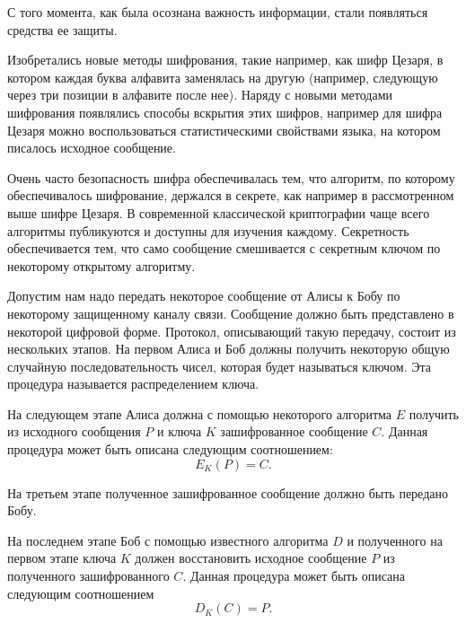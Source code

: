 С того момента, как была осознана важность информации, стали появляться
средства ее защиты. 

Изобретались новые методы
шифрования, такие например, как шифр Цезаря, в котором каждая буква
алфавита заменялась на другую (например, следующую через три позиции в
алфавите после нее). Наряду с новыми методами шифрования появлялись
способы вскрытия этих шифров, например для шифра Цезаря можно
воспользоваться статистическими свойствами языка, на котором
писалось исходное сообщение.

Очень часто безопасность шифра обеспечивалась тем, что алгоритм, по
которому обеспечивалось шифрование, держался в секрете, как например в
рассмотренном выше шифре Цезаря. В современной классической
криптографии чаще всего алгоритмы
публикуются и доступны для изучения каждому. Секретность
обеспечивается тем, что само сообщение смешивается с секретным ключом
по некоторому открытому алгоритму. 

Допустим нам надо передать некоторое сообщение от Алисы к Бобу по
некоторому защищенному каналу связи. Сообщение должно быть
представлено в некоторой цифровой форме.
Протокол, описывающий такую
передачу, состоит из нескольких этапов. На первом Алиса и Боб должны
получить некоторую общую случайную последовательность чисел, которая
будет называться ключом. Эта процедура называется распределением
ключа. 

На следующем этапе Алиса должна с помощью
некоторого алгоритма $E$ получить из исходного сообщения $P$ и ключа $K$
зашифрованное сообщение $C$. Данная процедура может быть описана следующим
соотношением: 
\begin{equation}
E_{K}\left(P\right) = C.
\label{eqPart3CryptoEncryptClass}
\end{equation}

На третьем этапе полученное зашифрованное сообщение должно быть
передано Бобу.

На последнем этапе Боб с помощью известного алгоритма $D$ и полученного на
первом этапе ключа $K$ должен восстановить исходное сообщение $P$ из
полученного зашифрованного $C$. Данная процедура может быть описана
следующим соотношением
\begin{equation}
D_{K}\left(C\right) = P.
\label{eqPart3CryptoDeEncryptClass}
\end{equation}

